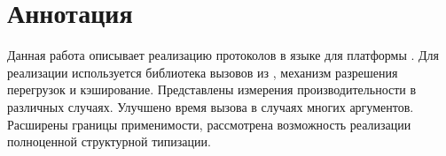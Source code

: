 \section*{Аннотация}
Данная работа описывает реализацию протоколов в языке  для платформы . Для реализации используется библиотека вызовов из , механизм разрешения перегрузок и кэширование. Представлены измерения производительности в различных случаях. Улучшено время вызова в случаях многих аргументов. Расширены границы применимости, рассмотрена возможность реализации полноценной структурной типизации. 

